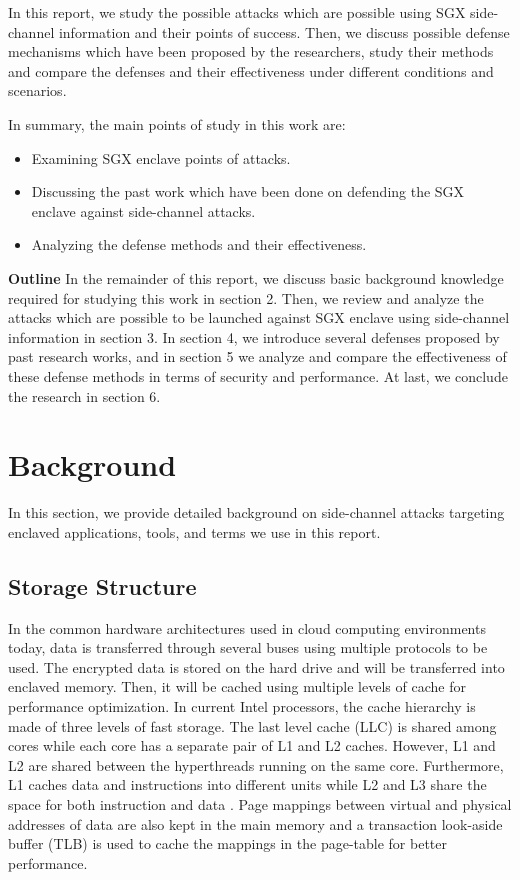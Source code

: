 In this report, we study the possible attacks which are possible using SGX side-channel information and their points of success. Then, we discuss possible defense mechanisms which have been proposed by the researchers, study their methods and compare the defenses and their effectiveness under different conditions and scenarios.

In summary, the main points of study in this work are:
\begin{itemize}
	\item Examining SGX enclave points of attacks.
	\item Discussing the past work which have been done on defending the SGX enclave against side-channel attacks.
	\item Analyzing the defense methods and their effectiveness.
\end{itemize} 
\textbf{Outline} In the remainder of this report, we discuss basic background knowledge required for studying this work in section 2. Then, we review and analyze the attacks which are possible to be launched against SGX enclave using side-channel information in section 3. In section 4, we introduce several defenses proposed by past research works, and in section 5 we analyze and compare the effectiveness of these defense methods in terms of security and performance. At last, we conclude the research in section 6.
\section{Background}
In this section, we provide detailed background on side-channel attacks targeting enclaved applications, tools, and terms we use in this report.

\subsection{Storage Structure}

In the common hardware architectures used in cloud computing environments today, data is transferred through several buses using multiple protocols to be used. The encrypted data is stored on the hard drive and will be transferred into enclaved memory. Then, it will be cached using multiple levels of cache for performance optimization. In current Intel processors, the cache hierarchy is made of three levels of fast storage. The last level cache (LLC) is shared among cores while each core has a separate pair of L1 and L2 caches. However, L1 and L2 are shared between the hyperthreads running on the same core. Furthermore, L1 caches data and instructions into different units while L2 and L3 share the space for both instruction and data \cite{brasser2017software}. Page mappings between virtual and physical addresses of data are also kept in the main memory and a transaction look-aside buffer (TLB) is used to cache the mappings in the page-table for better performance.

